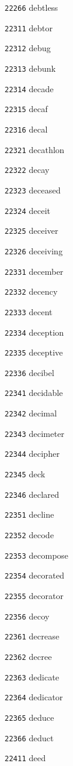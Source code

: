 \documentclass[twoside,11pt]{article}
\begin{document}
\begin{multicols}{5}
\begin{enumerate}
\item[\texttt{22266}] debtless
\item[\texttt{22311}] debtor
\item[\texttt{22312}] debug
\item[\texttt{22313}] debunk
\item[\texttt{22314}] decade
\item[\texttt{22315}] decaf
\item[\texttt{22316}] decal
\item[\texttt{22321}] decathlon
\item[\texttt{22322}] decay
\item[\texttt{22323}] deceased
\item[\texttt{22324}] deceit
\item[\texttt{22325}] deceiver
\item[\texttt{22326}] deceiving
\item[\texttt{22331}] december
\item[\texttt{22332}] decency
\item[\texttt{22333}] decent
\item[\texttt{22334}] deception
\item[\texttt{22335}] deceptive
\item[\texttt{22336}] decibel
\item[\texttt{22341}] decidable
\item[\texttt{22342}] decimal
\item[\texttt{22343}] decimeter
\item[\texttt{22344}] decipher
\item[\texttt{22345}] deck
\item[\texttt{22346}] declared
\item[\texttt{22351}] decline
\item[\texttt{22352}] decode
\item[\texttt{22353}] decompose
\item[\texttt{22354}] decorated
\item[\texttt{22355}] decorator
\item[\texttt{22356}] decoy
\item[\texttt{22361}] decrease
\item[\texttt{22362}] decree
\item[\texttt{22363}] dedicate
\item[\texttt{22364}] dedicator
\item[\texttt{22365}] deduce
\item[\texttt{22366}] deduct
\item[\texttt{22411}] deed

\end{enumerate}
\end{multicols}
\end{document}
